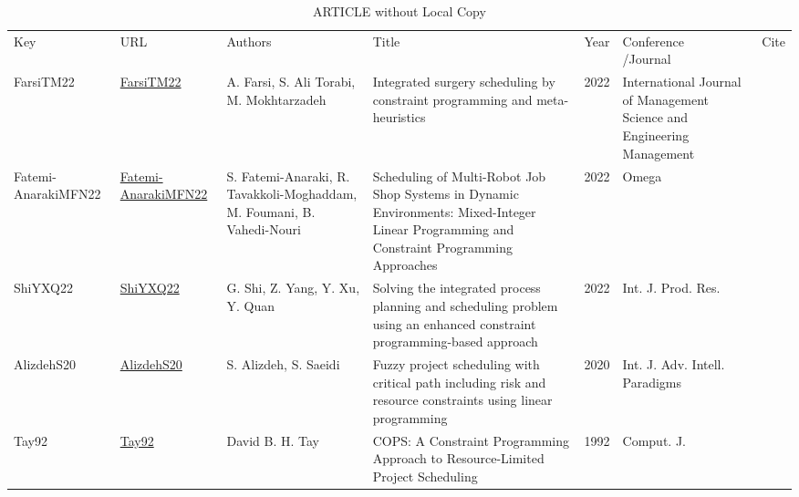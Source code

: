 {\scriptsize
\begin{longtable}{llp{5cm}p{10cm}rp{3cm}l}
\rowcolor{white}\caption{ARTICLE without Local Copy}\\ \toprule
\rowcolor{white}Key & URL & Authors & Title & Year & \shortstack{Conference\\/Journal} & Cite\\ \midrule
\endhead
\bottomrule
\endfoot
FarsiTM22 & \href{https://api.semanticscholar.org/CorpusID:250301745}{FarsiTM22} & A. Farsi, S. Ali Torabi, M. Mokhtarzadeh & Integrated surgery scheduling by constraint programming and meta-heuristics & 2022 & International Journal of Management Science and Engineering Management & \cite{FarsiTM22}\\Fatemi-AnarakiMFN22 & \href{https://api.semanticscholar.org/CorpusID:252524295}{Fatemi-AnarakiMFN22} & S. Fatemi-Anaraki, R. Tavakkoli-Moghaddam, M. Foumani, B. Vahedi-Nouri & Scheduling of Multi-Robot Job Shop Systems in Dynamic Environments: Mixed-Integer Linear Programming and Constraint Programming Approaches & 2022 & Omega & \cite{Fatemi-AnarakiMFN22}\\ShiYXQ22 & \href{https://doi.org/10.1080/00207543.2021.1963496}{ShiYXQ22} & G. Shi, Z. Yang, Y. Xu, Y. Quan & Solving the integrated process planning and scheduling problem using an enhanced constraint programming-based approach & 2022 & Int. J. Prod. Res. & \cite{ShiYXQ22}\\AlizdehS20 & \href{https://doi.org/10.1504/IJAIP.2020.106687}{AlizdehS20} & S. Alizdeh, S. Saeidi & Fuzzy project scheduling with critical path including risk and resource constraints using linear programming & 2020 & Int. J. Adv. Intell. Paradigms & \cite{AlizdehS20}\\Tay92 & \href{}{Tay92} & David B. H. Tay & {COPS:} {A} Constraint Programming Approach to Resource-Limited Project Scheduling & 1992 & Comput. J. & \cite{Tay92}\\\end{longtable}
}

